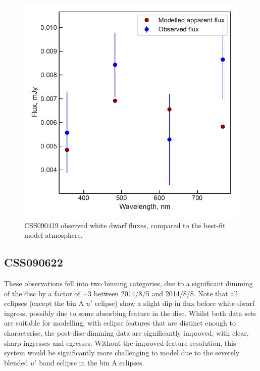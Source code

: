 \begin{figure}
    \centering
    \includegraphics[width=\textwidth]{figures/results/CSS090419/fluxplot.pdf}
    \caption{CSS090419 observed white dwarf fluxes, compared to the best-fit model atmosphere.}
    \label{fig:CSS090419 flux plot}
\end{figure}
\clearpage



\newpage
\subsection{CSS090622}

These observations fell into two binning categories, due to a significant dimming of the disc by a factor of $\sim 3$ between 2014/8/5 and 2014/8/8. Note that all eclipses (except the bin A $u'$ eclipse) show a slight dip in flux before white dwarf ingress, possibly due to some absorbing feature in the disc.
Whilst both data sets are suitable for modelling, with eclipse features that are distinct enough to characterise, the post-disc-dimming data are significantly improved, with clear, sharp ingresses and egresses. Without the improved feature resolution, this system would be significantly more challenging to model due to the severely blended $u'$ band eclipse in the bin A eclipses.

